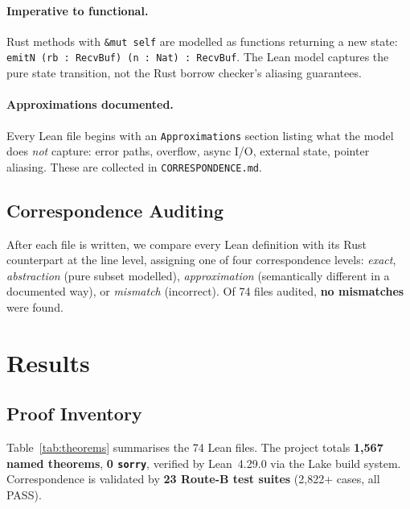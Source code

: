 \documentclass[sigconf,10pt]{acmart}
\begin{document}
\paragraph{Imperative to functional.}
Rust methods with \texttt{\&mut self} are modelled as functions returning
a new state: \texttt{emitN (rb : RecvBuf) (n : Nat) : RecvBuf}.
The Lean model captures the pure state transition, not the Rust borrow
checker's aliasing guarantees.

\paragraph{Approximations documented.}
Every Lean file begins with an \texttt{Approximations} section listing
what the model does \emph{not} capture: error paths, overflow, async I/O,
external state, pointer aliasing.
These are collected in \texttt{CORRESPONDENCE.md}.

\subsection{Correspondence Auditing}
\label{sec:correspondence}

After each file is written, we compare every Lean definition with its
Rust counterpart at the line level, assigning one of four correspondence
levels: \emph{exact}, \emph{abstraction} (pure subset modelled),
\emph{approximation} (semantically different in a documented way), or
\emph{mismatch} (incorrect).
Of 74 files audited, \textbf{no mismatches} were found.

\section{Results}
\label{sec:results}

\subsection{Proof Inventory}

Table~\ref{tab:theorems} summarises the 74 Lean files.
The project totals \textbf{1{,}567 named theorems}, \textbf{0 \texttt{sorry}},
verified by Lean~4.29.0 via the Lake build system.
Correspondence is validated by \textbf{23 Route-B test suites} (2{,}822+ cases, all PASS).
\end{document}
